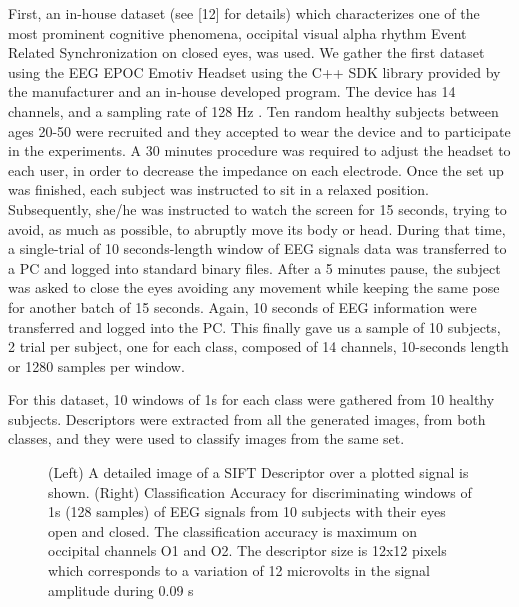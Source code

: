First, an in-house dataset (see [12] for details) which characterizes one of the most prominent cognitive phenomena, occipital visual alpha rhythm Event Related Synchronization on closed eyes, was used.  We gather the first dataset using the EEG EPOC Emotiv Headset using the C++ SDK library provided by the manufacturer and an in-house developed program. The device has 14 channels, and a sampling rate of 128 Hz \cite{c11}. Ten random healthy subjects between ages 20-50 were recruited and they accepted to wear the device and to participate in the experiments.  A 30 minutes procedure was required to adjust the headset to each user, in order to decrease the impedance on each electrode. Once the set up was finished, each subject was instructed to sit in a relaxed position. Subsequently, she/he was instructed to watch the screen for 15 seconds, trying to avoid, as much as possible, to abruptly move its body or head.  During that time, a single-trial of 10 seconds-length window of EEG signals data was transferred to a PC and logged into standard binary files. After a 5 minutes pause, the subject was asked to close the eyes avoiding any movement while keeping the same pose for another batch of 15 seconds.  Again, 10 seconds of EEG information were transferred and logged into the PC. This finally gave us a sample of 10 subjects,  2 trial per subject, one for each class, composed of 14 channels, 10-seconds length or 1280 samples per window. 

For this dataset, 10 windows of 1s for each class were gathered from 10 healthy subjects.  Descriptors were extracted from all the generated images, from both classes, and they were used to classify images from the same set.     
   
  \begin{figure}[thpb]
      \centering
      \setlength\fboxsep{0pt}
	  \setlength\fboxrule{0.5pt}
      \caption[Alpha Waves Classification]{(Left) A detailed image of a SIFT Descriptor over a plotted signal is shown.  (Right) Classification Accuracy for discriminating windows of 1s (128 samples) of EEG signals from 10 subjects with their eyes open and closed.  The classification accuracy is maximum on occipital channels O1 and O2. The descriptor size is 12x12 pixels which corresponds to a variation of 12 microvolts in the signal amplitude during 0.09 s}
      \label{figure1}
   \end{figure}
   
